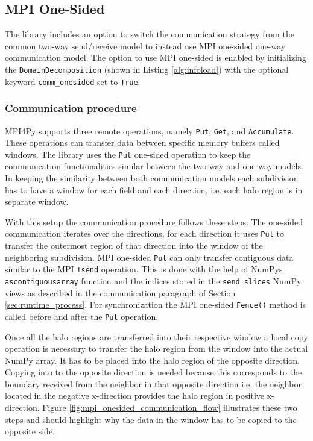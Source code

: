 \newpage
\subsection{MPI One-Sided}
\label{sec:onesided}
The library includes an option to switch the communication strategy from the common two-way send/receive model to instead use MPI one-sided one-way communication model.
The option to use MPI one-sided is enabled by initializing the \texttt{DomainDecomposition} (shown in Listing \ref{alg:infoload}) with the optional keyword \texttt{comm\_onesided} set to \texttt{True}.

\subsubsection{Communication procedure}
MPI4Py supports three remote operations, namely \texttt{Put}, \texttt{Get}, and \texttt{Accumulate}.
These operations can transfer data between specific memory buffers called windows.
The library uses the \texttt{Put} one-sided operation to keep the communication functionalities similar between the two-way and one-way models.
In keeping the similarity between both communication models each subdivision has to have a window for each field and each direction, i.e. each halo region is in separate window.

With this setup the communication procedure follows these steps: 
The one-sided communication iterates over the directions, for each direction it uses \texttt{Put} to transfer the outermost region of that direction into the window of the neighboring subdivision.
MPI one-sided \texttt{Put} can only transfer contiguous data similar to the MPI \texttt{Isend} operation.
This is done with the help of NumPys \texttt{ascontiguousarray} function and the indices stored in the \texttt{send\_slices} NumPy views as described in the communication paragraph of Section \ref{sec:runtime_process}.
For synchronization the MPI one-sided \texttt{Fence()} method is called before and after the \texttt{Put} operation.

Once all the halo regions are transferred into their respective window a local copy operation is necessary to transfer the halo region from the window into the actual NumPy array.
It has to be placed into the halo region of the opposite direction.
Copying into to the opposite direction is needed because this corresponds to the boundary received from the neighbor in that opposite direction i.e. the neighbor located in the negative x-direction provides the halo region in positive x-direction.
Figure \ref{fig:mpi_onesided_communication_flow} illustrates these two steps and should highlight why the data in the window has to be copied to the opposite side.

